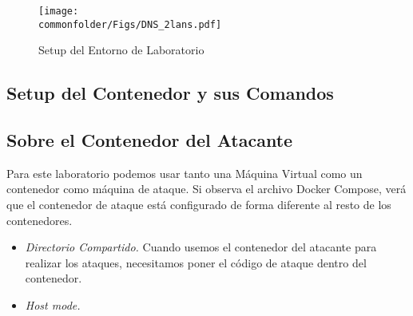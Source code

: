 \begin{figure}[htb]
\centering
\texttt{[image: \\commonfolder/Figs/DNS\_2lans.pdf]}
\caption{Setup del Entorno de Laboratorio}
\label{dns:fig:environment}
\end{figure}



\subsection{Setup del Contenedor y sus Comandos}






\subsection{Sobre el Contenedor del Atacante} 

Para este laboratorio podemos usar tanto una Máquina Virtual como un contenedor como máquina de ataque. Si observa el archivo Docker Compose, verá que el contenedor de ataque está configurado de forma diferente al resto de los contenedores.


\begin{itemize}
\item \textit{Directorio Compartido.} Cuando usemos el contenedor del atacante para realizar los ataques, necesitamos poner el código de ataque dentro del contenedor.



\item \textit{Host mode.} 

\end{itemize}








